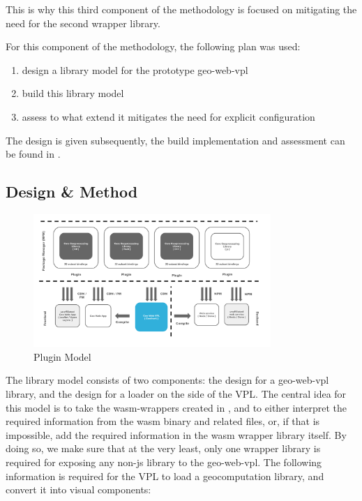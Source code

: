 This is why this third component of the methodology is focused on mitigating the need for the second wrapper library. 

For this component of the methodology, the following plan was used: 
\begin{enumerate}[-]
  \item design a library model for the prototype \ac*{geo-web-vpl}
  \item build this library model 
  \item assess to what extend it mitigates the need for explicit configuration
\end{enumerate}

The design is given subsequently, the build implementation and assessment can be found in .

\subsection{Design \& Method}

\begin{figure}
  \centering
  \graphicspath{ {../../assets/diagrams/} }
  \includegraphics[width=340px]{Model Proposal.png}
  \caption{Plugin Model}
  \label{fig:plugin-model}
\end{figure}

The library model consists of two components: the design for a geo-web-vpl library, and the design for a 
loader on the side of the VPL. 
The central idea for this model is to take the wasm-wrappers created in , and to either interpret the required information from the wasm binary and related files, or, if that is impossible, add the required information in the wasm wrapper library itself.
By doing so, we make sure that at the very least, only one wrapper library is required for exposing any non-js library to the \ac{geo-web-vpl}.
The following information is required for the VPL to load a geocomputation library, and convert it into visual components:

